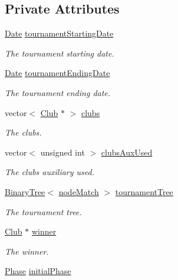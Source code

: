 \subsection*{Private Attributes}
\begin{DoxyCompactItemize}
\item 
\hyperlink{class_date}{Date} \hyperlink{class_tournament_afe5c5994c15194a320914831d05e40fc}{tournament\+Starting\+Date}
\begin{DoxyCompactList}\small\item\em The tournament starting date. \end{DoxyCompactList}\item 
\hyperlink{class_date}{Date} \hyperlink{class_tournament_a85027b414ba2ddd7cd513c399588d2a8}{tournament\+Ending\+Date}
\begin{DoxyCompactList}\small\item\em The tournament ending date. \end{DoxyCompactList}\item 
vector$<$ \hyperlink{class_club}{Club} $\ast$ $>$ \hyperlink{class_tournament_a0bc3b92b52e1e0b13c466f5e14100a10}{clubs}
\begin{DoxyCompactList}\small\item\em The clubs. \end{DoxyCompactList}\item 
vector$<$ unsigned int $>$ \hyperlink{class_tournament_a23735b59d67642c8e8e826b9638d588c}{clubs\+Aux\+Used}
\begin{DoxyCompactList}\small\item\em The clubs auxiliary used. \end{DoxyCompactList}\item 
\hyperlink{class_binary_tree}{Binary\+Tree}$<$ \hyperlink{_tournament_8hpp_a59a90f79e961bd9bc490adbf767f7cc4}{node\+Match} $>$ \hyperlink{class_tournament_a561cd3b82b192558910f85ae1c1f5bea}{tournament\+Tree}
\begin{DoxyCompactList}\small\item\em The tournament tree. \end{DoxyCompactList}\item 
\hyperlink{class_club}{Club} $\ast$ \hyperlink{class_tournament_a4e662ffc9d1c3c868bb6db5c60be5c58}{winner}
\begin{DoxyCompactList}\small\item\em The winner. \end{DoxyCompactList}\item 
\hyperlink{_tournament_8hpp_ae1c5184dc404edf057ed537bcfddef84}{Phase} \hyperlink{class_tournament_a1536d0ea138cb8ccd6ce0ef5e2d0f6ec}{initial\+Phase}

\end{DoxyCompactItemize}
